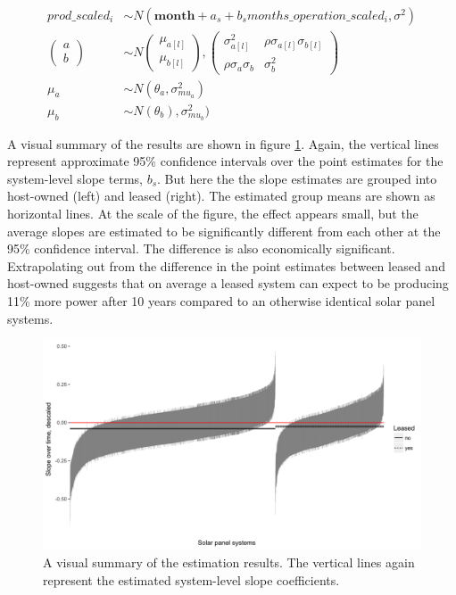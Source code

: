 \documentclass[12pt]{article}
\begin{document}
\begin{align}
prod\_scaled_{i} &\sim N(\mathbf{month} + a_s + b_s months\_operation\_scaled_{i}, \sigma^2)\\
\label{eqn:observation_level_rest2}
\begin{pmatrix}
  a\\
  b
\end{pmatrix}
&\sim N
\begin{pmatrix}
  \mu_{a[l]}\\
  \mu_{b[l]}
\end{pmatrix},
\begin{pmatrix}
  \sigma_{a[l]}^2 & \rho \sigma_{a[l]} \sigma_{b[l]} \\
  \rho \sigma_a \sigma_b & \sigma_b^2
\end{pmatrix} \\
\mu_{a} &\sim N(\theta_a, \sigma_{mu_a}^2) \\
\mu_{b} & \sim N(\theta_b), \sigma_{mu_b}^2)
\label{eqn:lease_model}
\end{align}

A visual summary of the results are shown in figure \ref{lease_sys_fig}. Again, the vertical lines represent approximate 95\% confidence intervals over the point estimates for the system-level slope terms, $b_s$. But here the the slope estimates are grouped into host-owned (left) and leased (right). The estimated group means are shown as horizontal lines. At the scale of the figure, the effect appears small, but the average slopes are estimated to be significantly different from each other at the 95\% confidence interval. The difference is also economically significant. Extrapolating out from the difference in the point estimates between leased and host-owned suggests that on average a leased system can expect to be producing 11\% more power after 10 years compared to an otherwise identical solar panel systems.

\begin{figure}
	\includegraphics[width=.8\textwidth]{figures/lease_sys_fig.png}
	\caption{A visual summary of the estimation results. The vertical lines again represent the estimated system-level slope coefficients.}
	\label{lease_sys_fig}
\end{figure}
\end{document}
